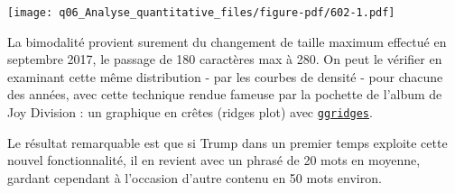 \documentclass[
  letterpaper,
  DIV=11,
  numbers=noendperiod]{scrreprt}
\newenvironment{Shaded}{\begin{snugshade}}{\end{snugshade}}
\newcommand{\AttributeTok}[1]{\textcolor[rgb]{0.40,0.45,0.13}{#1}}
\newcommand{\CommentTok}[1]{\textcolor[rgb]{0.37,0.37,0.37}{#1}}
\newcommand{\ConstantTok}[1]{\textcolor[rgb]{0.56,0.35,0.01}{#1}}
\newcommand{\DecValTok}[1]{\textcolor[rgb]{0.68,0.00,0.00}{#1}}
\newcommand{\FunctionTok}[1]{\textcolor[rgb]{0.28,0.35,0.67}{#1}}
\newcommand{\NormalTok}[1]{\textcolor[rgb]{0.00,0.23,0.31}{#1}}
\newcommand{\OtherTok}[1]{\textcolor[rgb]{0.00,0.23,0.31}{#1}}
\newcommand{\SpecialCharTok}[1]{\textcolor[rgb]{0.37,0.37,0.37}{#1}}
\newcommand{\StringTok}[1]{\textcolor[rgb]{0.13,0.47,0.30}{#1}}
\begin{document}
\texttt{[image: q06\_Analyse\_quantitative\_files/figure-pdf/602-1.pdf]}

La bimodalité provient surement du changement de taille maximum effectué
en septembre 2017, le passage de 180 caractères max à 280. On peut le
vérifier en examinant cette même distribution - par les courbes de
densité - pour chacune des années, avec cette technique rendue fameuse
par la pochette de l'album de Joy Division : un graphique en crêtes
(ridges plot) avec
\href{https://cran.r-project.org/web/packages/ggridges/vignettes/introduction.html}{\texttt{ggridges}}.

Le résultat remarquable est que si Trump dans un premier temps exploite
cette nouvel fonctionnalité, il en revient avec un phrasé de 20 mots en
moyenne, gardant cependant à l'occasion d'autre contenu en 50 mots
environ.

\begin{Shaded}
\end{Shaded}
\end{document}
